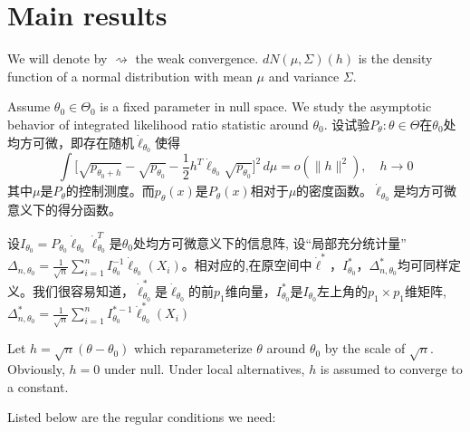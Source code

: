 \documentclass[review]{elsarticle}
\begin{document}
\section{Main results}

We will denote by $\rightsquigarrow$ the weak convergence. 
$dN(\mu,\Sigma)(h)$ is the density function of a normal distribution with mean $\mu$ and variance $\Sigma$.

Assume $\theta_0\in\Theta_0$ is a fixed parameter in null space. We study the asymptotic behavior of integrated likelihood ratio statistic around $\theta_0$.
设试验$P_\theta : \theta\in \Theta$在$\theta_0$处均方可微，即存在随机$\dot{\ell}_{\theta_0}$使得
\begin{equation}
    \int \big[\sqrt{p_{\theta_0+h}}-\sqrt{p_{\theta_0}}-\frac{1}{2}h^T\dot{\ell}_{\theta_0}\sqrt{p_{\theta_0}}\big]^2\, d\mu=o(\|h\|^2),\quad h\to 0
\end{equation}
其中$\mu$是$P_{\theta}$的控制测度。而$p_{\theta}(x)$是$P_{\theta}(x)$相对于$\mu$的密度函数。$\dot{\ell}_{\theta_0}$是均方可微意义下的得分函数。

设$I_{\theta_0}=P_{\theta_0}\dot{\ell}_{\theta_0}\dot{\ell}_{\theta_0}^T$是$\theta_0$处均方可微意义下的信息阵,
设“局部充分统计量”$\Delta_{n,\theta_0}=\frac{1}{\sqrt{n}}\sum_{i=1}^n I_{\theta_0}^{-1}\dot{\ell}_{\theta_0}(X_i)$。相对应的,在原空间中$\dot{\ell}^*$，$I^*_{\theta_0}$，$\Delta_{n,\theta_0}^*$均可同样定义。我们很容易知道，$\dot{\ell}^*_{\theta_0}$是$\dot{\ell}_{\theta_0}$的前$p_1$维向量，$I^*_{\theta_0}$是$I_{\theta_0}$左上角的$p_1\times p_1$维矩阵,$\Delta_{n,\theta_0}^*=\frac{1}{\sqrt{n}}\sum_{i=1}^n I_{\theta_0}^{*-1}\dot{\ell}^*_{\theta_0}(X_i)$

Let $h=\sqrt{n}(\theta-\theta_0)$ which reparameterize   $\theta$ around $\theta_0$ by the scale of $\sqrt{n}$.  Obviously, $h=0$ under null. Under local alternatives, $h$ is assumed to converge to a constant.

Listed below are the regular conditions we need:
\end{document}
